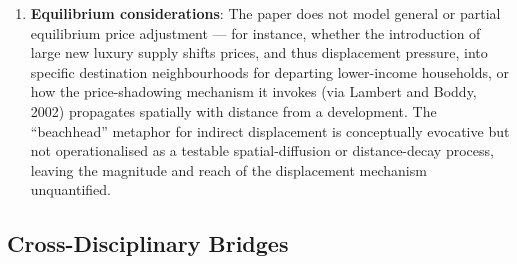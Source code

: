 \begin{enumerate}
  \item \textbf{Equilibrium considerations}: The paper does not model general or partial equilibrium price adjustment --- for instance, whether the introduction of large new luxury supply shifts prices, and thus displacement pressure, into specific destination neighbourhoods for departing lower-income households, or how the price-shadowing mechanism it invokes (via Lambert and Boddy, 2002) propagates spatially with distance from a development. The ``beachhead'' metaphor for indirect displacement is conceptually evocative but not operationalised as a testable spatial-diffusion or distance-decay process, leaving the magnitude and reach of the displacement mechanism unquantified.
\end{enumerate}

\subsection*{Cross-Disciplinary Bridges}

